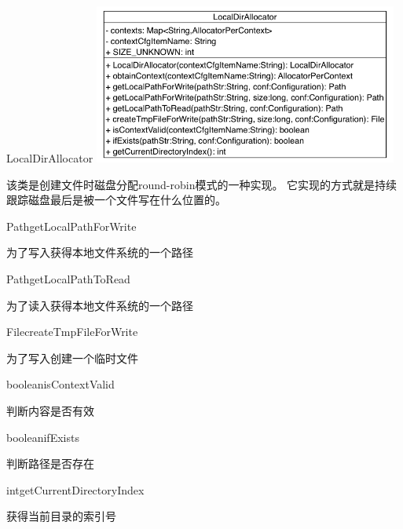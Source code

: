 \begin{XeClass}{LocalDirAllocator}
\includegraphics[width=10cm]{cdig/LocalDirAllocator.png}
     
 该类是创建文件时磁盘分配round-robin模式的一种实现。
 它实现的方式就是持续跟踪磁盘最后是被一个文件写在什么位置的。

    \begin{XeMethod}{\XePublic}{Path}{getLocalPathForWrite}
         
 为了写入获得本地文件系统的一个路径

    \end{XeMethod}

    \begin{XeMethod}{\XePublic}{Path}{getLocalPathToRead}
         
 为了读入获得本地文件系统的一个路径

    \end{XeMethod}

    \begin{XeMethod}{\XePublic}{File}{createTmpFileForWrite}
         
 为了写入创建一个临时文件

    \end{XeMethod}

    \begin{XeMethod}{\XePublic}{boolean}{isContextValid}
         
 判断内容是否有效

    \end{XeMethod}

    \begin{XeMethod}{\XePublic}{boolean}{ifExists}
         
 判断路径是否存在

    \end{XeMethod}

    \begin{XeMethod}{}{int}{getCurrentDirectoryIndex}
         
 获得当前目录的索引号


\end{XeMethod}
\end{XeClass}
